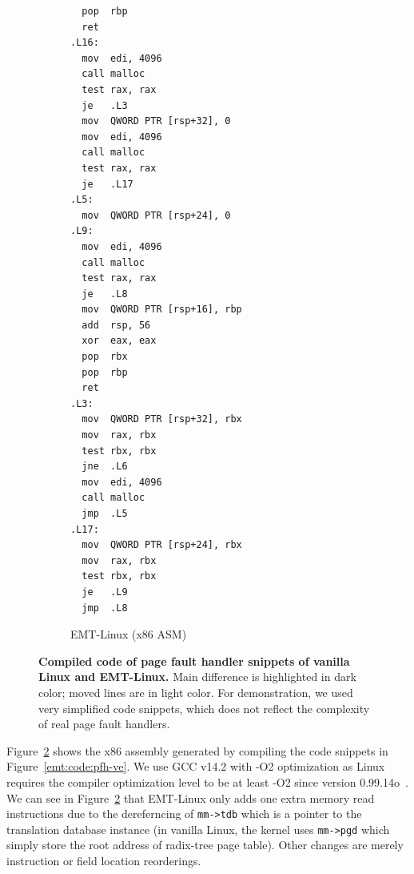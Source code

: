 \begin{figure}
\begin{subfigure}[b]{0.23\textwidth}
\begin{verbatim}
  pop  rbp
  ret
.L16:
  mov  edi, 4096
  call malloc
  test rax, rax
  je   .L3
  mov  QWORD PTR [rsp+32], 0
  mov  edi, 4096
  call malloc
  test rax, rax
  je   .L17
.L5:
  mov  QWORD PTR [rsp+24], 0
.L9:
  mov  edi, 4096
  call malloc
  test rax, rax
  je   .L8
  mov  QWORD PTR [rsp+16], rbp
  add  rsp, 56
  xor  eax, eax
  pop  rbx
  pop  rbp
  ret
.L3:
  mov  QWORD PTR [rsp+32], rbx
  mov  rax, rbx
  test rbx, rbx
  jne  .L6
  mov  edi, 4096
  call malloc
  jmp  .L5
.L17:
  mov  QWORD PTR [rsp+24], rbx
  mov  rax, rbx
  test rbx, rbx
  je   .L9
  jmp  .L8
\end{verbatim}
\vspace{-10pt}
\caption{EMT-Linux (x86 ASM)}
\label{emt:fig:eval:emt-asm}
\end{subfigure}
\vspace{-10pt}
\caption{{\bf Compiled code of page fault handler snippets 
  of vanilla Linux and EMT-Linux.} 
  Main difference is highlighted in dark color; moved lines are in light color.
  For demonstration, we used very simplified code snippets, which does not reflect 
  the complexity of real page fault handlers.}
\label{emt:fig:eval:asm}
\end{figure}

Figure~\ref{emt:fig:eval:asm} shows 
  the x86 assembly generated by compiling the code snippets in Figure~\ref{emt:code:pfh-ve}.
We use GCC v14.2 with -O2 optimization as Linux requires the compiler optimization level 
  to be at least -O2 since version 0.99.14o~\cite{linux:require-o2}.
We can see in Figure~\ref{emt:fig:eval:asm} that
  EMT-Linux only adds one extra memory read instructions
  due to the dereferncing of \texttt{\small mm->tdb} which is a pointer to the translation database instance
  (in vanilla Linux, the kernel uses \texttt{mm->pgd} which simply store the root address of radix-tree page table).
Other changes are merely instruction or field location reorderings.



